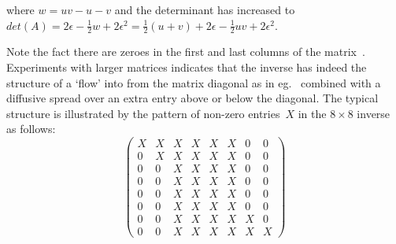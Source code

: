 \normalsize
where $w=uv-u-v$ and the determinant has increased to $det(A)=2\epsilon - \frac{1}{2}w  +2\epsilon^2=
\frac{1}{2}(u+v)  + 2\epsilon - \frac{1}{2}uv  +2\epsilon^2$.

Note the fact there are zeroes  in the first and last columns of the matrix~.
Experiments with larger matrices indicates that the inverse has indeed
the structure of  a `flow' into from the matrix diagonal as in eg.\ 
combined with a diffusive spread over an extra entry above or below the diagonal.
The typical structure is illustrated by the pattern of non-zero entries~$X$ in the
$8\times8$ inverse as follows:
\begin{equation}\label{eq:matX}
\begin{pmatrix}
X & X & X & X & X & X & 0 & 0\\
0 & X & X & X & X & X & 0 & 0\\
0 & 0 & X & X & X & X & 0 & 0\\
0 & 0 & X & X & X & X & 0 & 0\\
0 & 0 & X & X & X & X & 0 & 0\\
0 & 0 & X & X & X & X & 0 & 0\\
0 & 0 & X & X & X & X & X & 0\\
0 & 0 & X & X & X & X & X & X
\end{pmatrix}
\end{equation}

